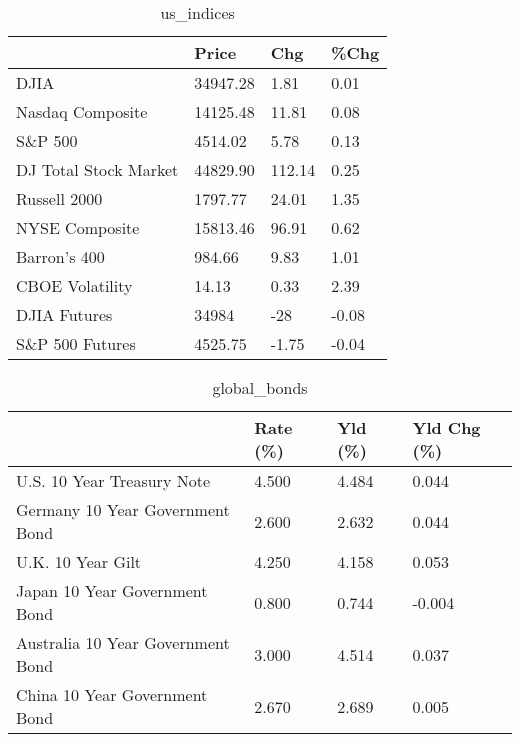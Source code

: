 \documentclass{article}%
\begin{document}
%


\begin{table}[htbp]%
\caption{us\_indices}%
\centering%
\begin{adjustbox}{width=1\textwidth}%
\begin{tabular}{llll}
\toprule
                      &    Price &    Chg &  \%Chg \\
\midrule
                 DJIA & 34947.28 &   1.81 &  0.01 \\
     Nasdaq Composite & 14125.48 &  11.81 &  0.08 \\
              S\&P 500 &  4514.02 &   5.78 &  0.13 \\
DJ Total Stock Market & 44829.90 & 112.14 &  0.25 \\
         Russell 2000 &  1797.77 &  24.01 &  1.35 \\
       NYSE Composite & 15813.46 &  96.91 &  0.62 \\
         Barron's 400 &   984.66 &   9.83 &  1.01 \\
      CBOE Volatility &    14.13 &   0.33 &  2.39 \\
         DJIA Futures &    34984 &    -28 & -0.08 \\
      S\&P 500 Futures &  4525.75 &  -1.75 & -0.04 \\
\bottomrule
\end{tabular}
%
\end{adjustbox}%
\end{table}

%


\begin{table}[htbp]%
\caption{global\_bonds}%
\centering%
\begin{adjustbox}{width=1\textwidth}%
\begin{tabular}{llll}
\toprule
                                  & Rate (\%) & Yld (\%) & Yld Chg (\%) \\
\midrule
       U.S. 10 Year Treasury Note &    4.500 &   4.484 &       0.044 \\
  Germany 10 Year Government Bond &    2.600 &   2.632 &       0.044 \\
                U.K. 10 Year Gilt &    4.250 &   4.158 &       0.053 \\
    Japan 10 Year Government Bond &    0.800 &   0.744 &      -0.004 \\
Australia 10 Year Government Bond &    3.000 &   4.514 &       0.037 \\
    China 10 Year Government Bond &    2.670 &   2.689 &       0.005 \\
\bottomrule
\end{tabular}
%
\end{adjustbox}%
\end{table}
\end{document}
